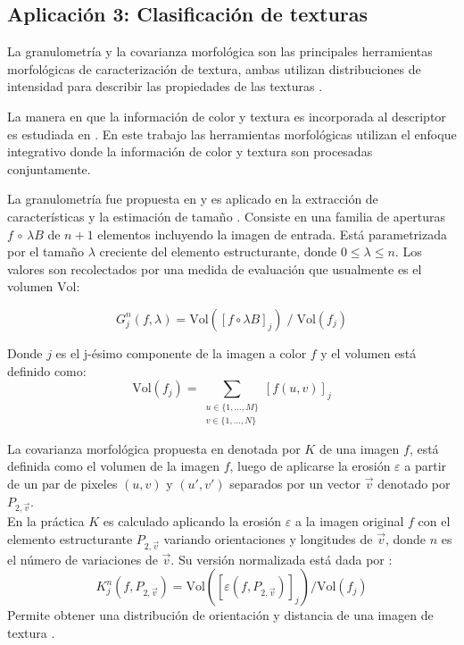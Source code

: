 \subsection{Aplicación 3: Clasificación de texturas}
La granulometría y la covarianza morfológica son las principales herramientas morfológicas de caracterización de textura, ambas utilizan distribuciones de intensidad para describir las propiedades de las texturas \cite{lefevre2009beyond}.


La manera en que la información de color y textura es incorporada al descriptor es estudiada en \cite{palm2004color,van2005parallel}. En este trabajo las herramientas morfológicas utilizan el enfoque integrativo donde la información de color y textura son procesadas conjuntamente.

La granulometría fue propuesta en \cite{matheron1975random} y es aplicado en la extracción de características y la estimación de tamaño \cite{vincent2000granulometries,soille2013morphological}. Consiste en una familia de aperturas $f \,\circ \, \lambda B $ de $n+1$ elementos incluyendo la imagen de entrada. Está parametrizada por el tamaño $\lambda$ creciente del elemento estructurante, donde $0 \leq \lambda \leq n $. Los valores son recolectados por una medida de evaluación que usualmente es el volumen $\mathrm{Vol}$:

\begin{equation}
G^{n}_{j}(f,\lambda)= \mathrm{Vol}([f\circ \lambda B ]_{j}) \; / \; \mathrm{Vol}(f_{j})
\end{equation}

Donde $j$ es el j-ésimo componente de la imagen a color $f$ y el volumen está definido como:
\begin{equation}
\mathrm{Vol}(f_j) = \sum_{\substack{u\in \{1, ..., M\}\\ v \in \{1, ..., N\}}}[f(u,v)]_{j} 
\end{equation}

La covarianza morfológica propuesta en \cite{matheron1975random,maragos1989pattern} denotada por $K$ de una imagen $f$, está definida como el volumen de la imagen $f$, luego de aplicarse la erosión $\varepsilon$ a partir de un par de pixeles $(u,v)$ y  $(u',v')$ separados por un vector $\vec{v}$ denotado por $P_{2,\vec{v}}$.\\
En la práctica $K $ es calculado aplicando la erosión $\varepsilon$ a la imagen original $f$ con el elemento estructurante $P_{2,\vec{v}}$ variando orientaciones y longitudes de $\vec{v}$, donde $n$ es el número de variaciones de $\vec{v}$. Su versión normalizada está dada por :
\begin{equation}
K^{n}_{j}(f,P_{2,\vec{v}})  = \mathrm{Vol}([\varepsilon(f,P_{2,\vec{v}})]_{j}) / \mathrm{Vol}(f_{j})
\end{equation}
Permite obtener una distribución de orientación y distancia de una imagen de textura \cite{aptoula2007morphological}.


